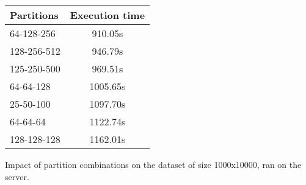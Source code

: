 \begin{tabular}{l c}
    \toprule
    \textbf{Partitions} & \textbf{Execution time} \\
    \midrule
    64-128-256     & 910.05s    \\ 
    128-256-512    & 946.79s    \\ 
    125-250-500    & 969.51s    \\ 
    64-64-128      & 1005.65s   \\
    25-50-100      & 1097.70s   \\
    64-64-64       & 1122.74s   \\
    128-128-128    & 1162.01s   \\
    \bottomrule
\end{tabular}
\caption{Impact of partition combinations on the dataset of size 1000x10000, ran on the server.}
\label{tab:q3_server_optimisations}